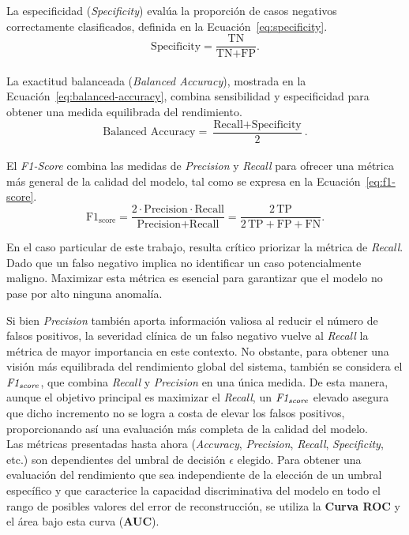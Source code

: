 \documentclass[a4paper,10pt]{book}
\begin{document}
La especificidad (\emph{Specificity}) evalúa la proporción de casos negativos correctamente clasificados, definida en la Ecuación~\ref{eq:specificity}.
\begin{equation}
	\text{Specificity} =
	\frac{\text{TN}}
	{\text{TN} + \text{FP}}.
	\label{eq:specificity}
\end{equation}\\

La exactitud balanceada (\emph{Balanced Accuracy}), mostrada en la Ecuación~\ref{eq:balanced-accuracy}, combina sensibilidad y especificidad para obtener una medida equilibrada del rendimiento.
\begin{equation}
	\text{Balanced Accuracy} =
	\frac{\text{Recall} + \text{Specificity}}{2}.
	\label{eq:balanced-accuracy}
\end{equation}\\

El \emph{F1-Score} combina las medidas de \emph{Precision} y \emph{Recall} para ofrecer una métrica más general de la calidad del modelo, tal como se expresa en la Ecuación~\ref{eq:f1-score}.
\begin{equation}
	\text{F1}_{\text{score}} =
	\frac{2 \cdot \text{Precision} \cdot \text{Recall}}
	{\text{Precision} + \text{Recall}}
	=
	\frac{2\,\text{TP}}
	{2\,\text{TP} + \text{FP} + \text{FN}}.
	\label{eq:f1-score}
\end{equation}

En el caso particular de este trabajo, resulta crítico priorizar la métrica de \emph{Recall}. Dado que un falso negativo implica no identificar un caso potencialmente maligno. Maximizar esta métrica es esencial para garantizar que el modelo no pase por alto ninguna anomalía.

Si bien \emph{Precision} también aporta información valiosa al reducir el número de falsos positivos, la severidad clínica de un falso negativo vuelve al \emph{Recall} la métrica de mayor importancia en este contexto.
No obstante, para obtener una visión más equilibrada del rendimiento global del sistema, también se considera el $\emph{F1}_{\emph{score}}$, que combina \emph{Recall} y \emph{Precision} en una única medida. De esta manera, aunque el objetivo principal es maximizar el \emph{Recall}, un $\emph{F1}_{\emph{score}}$ elevado asegura que dicho incremento no se logra a costa de elevar los falsos positivos, proporcionando así una evaluación más completa de la calidad del modelo.\\

Las métricas presentadas hasta ahora (\emph{Accuracy}, \emph{Precision}, \emph{Recall}, \emph{Specificity}, etc.) son dependientes del umbral de decisión $\epsilon$ elegido. Para obtener una evaluación del rendimiento que sea independiente de la elección de un umbral específico y que caracterice la capacidad discriminativa del modelo en todo el rango de posibles valores del error de reconstrucción, se utiliza la \textbf{Curva ROC} y el área bajo esta curva (\textbf{AUC}).\\
\end{document}
